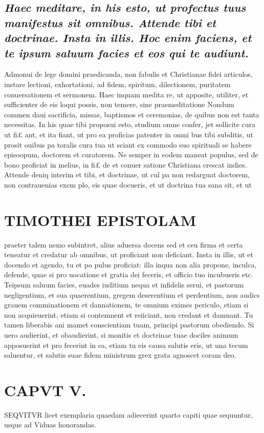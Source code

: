 \documentclass{article}
\begin{document}
\begin{pages}
\subsection*{\textit{Haec meditare, in his esto, ut profectus tuus manifestus sit omnibus. Attende tibi et doctrinae. Insta in illis. Hoc enim faciens, et te ipsum saluum facies et eos qui te audiunt. }}\pstart Admonui de lege domini praedicanda, non fabulis et Christianae fidei articulos, instare lectioni, exhortationi, ad fidem, spiritum, dilectionem, puritatem conuersationem et sermonem. Haec inquam medita re, ut apposite, utiliter, et sufficienter de eis loqui possis, non temere, sine praemeditatione Nondum commen daui sacrificia, missas, baptismos et ceremonias, de quibus non est tanta necessitas. In his quae tibi proposui esto, studium omne confer, jet sollicite cura ut fi£ ant, et ita fiant, ut pro ea proficias patenter in omni bus tibi subditis, ut prosit ouibus pa toralis cura tua ut sciant ex commodo suo spirituali se habere episoopum, doctorem et curatorem. Ne semper in eodem maneat populus, sed de bono proficiat in melius, in fi£ de et conuer satione Christiana crescat indies.  \pend\pstart Attende deniq interim et tibi, et doctrinae, ut cul pa non redarguat doctorem, non contrauenias exem plo, eis quae docueris, et ut doctrina tua sana sit, et ut  \pend
\section*{TIMOTHEI EPISTOLAM }
\marginpar{[ p.113 ]}\pstart praeter talem nemo subintret, alius aduersa docens sed et ceu firma et certa teneatur et credatur ab omnibus, ut proficiant non deficiant.  \pend\pstart Insta in illis, ut et docendo et agendo, tu et po pulus proficiat: illa inqua non alia propone, inculca, defende, quae si pro uocatione et gratia dei feceris, et officio tuo incubueris etc.  \pend\pstart Teipsum saluum facies, euades iuditium nequa et infidelis serui, et pastorum negligentium, et sua quaerentium, gregem deserentium et perdentium, non audics grauem comminationem et dannationem, te omnium eximes periculo, etiam si non acquieuerint, etiam si contemnent et reiiciant, non credant et damnant. Tu tamen liberabis ani mamet conscientiam tuam, principi pastorum obediendo.  \pend\pstart Si uero audierint, et obaudierint, si monitis et doctrinae tuae dociles animum apposuerint et pro fecerint in ea, etiam tu eis causa salutis eris, ut una tecum saluentur, et salutis suae fidem ministrum grex grata agnoscet coram deo.  \pend
\endnumbering\beginnumbering\section{CAPVT V.}\pstart SEQVITVR licet exemplaria quaedam adiecerint quarto capiti quae sequuntur, usque ad Viduas honorandas.  \pend

\end{pages}
\end{document}

